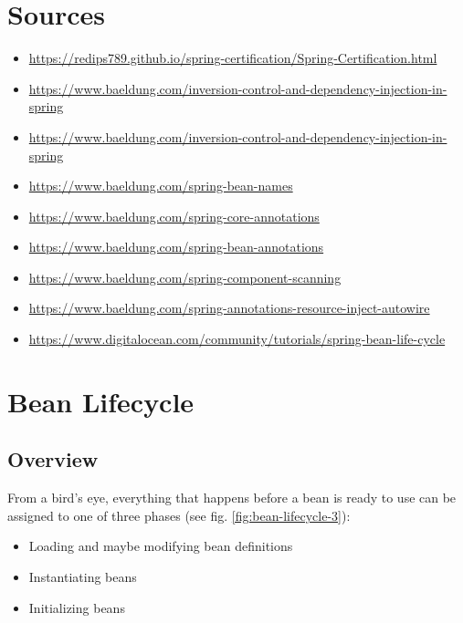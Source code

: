 \documentclass{scrartcl}
\begin{document}

\section{Sources}

\begin{itemize}
    \item \url{https://redips789.github.io/spring-certification/Spring-Certification.html}
    \item \url{https://www.baeldung.com/inversion-control-and-dependency-injection-in-spring}
    \item \url{https://www.baeldung.com/inversion-control-and-dependency-injection-in-spring}


    \item \url{https://www.baeldung.com/spring-bean-names}
    \item \url{https://www.baeldung.com/spring-core-annotations}
    \item \url{https://www.baeldung.com/spring-bean-annotations}
    \item \url{https://www.baeldung.com/spring-component-scanning}
    \item \url{https://www.baeldung.com/spring-annotations-resource-inject-autowire}
    \item \url{https://www.digitalocean.com/community/tutorials/spring-bean-life-cycle}
\end{itemize}

\section{Bean Lifecycle}
\subsection{Overview}

From a bird's eye, everything that happens before a bean is ready to use can be assigned to one of three phases (see fig. \ref{fig:bean-lifecycle-3}):

\begin{itemize}
    \item Loading and maybe modifying bean definitions
    \item Instantiating beans
    \item Initializing beans
\end{itemize}
\end{document}
